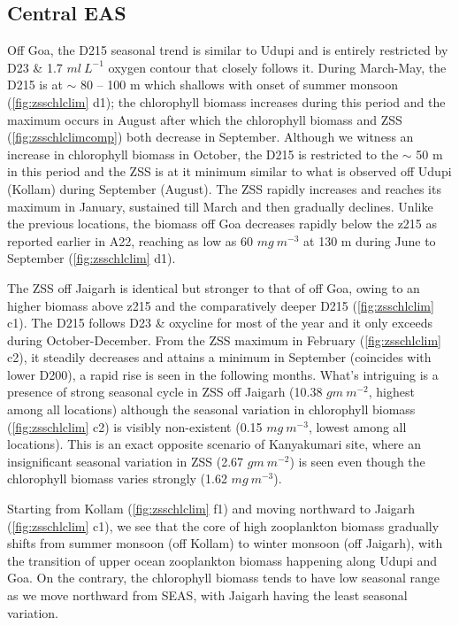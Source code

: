 \documentclass{article}
\begin{document}
	\subsection{Central EAS}
	Off Goa, the D215 seasonal trend is similar to Udupi and is entirely restricted by D23 \& 1.7 $ml \ L^{-1}$ oxygen contour that closely follows it. During March-May, the D215 is at $\sim$ 80 -- 100 m which shallows with onset of summer monsoon (\cref{fig:zsschlclim} d1); the chlorophyll biomass increases during this period and the maximum occurs in August after which the chlorophyll biomass and ZSS (\cref{fig:zsschlclimcomp}) both decrease in September. Although we witness an increase in chlorophyll biomass in October, the D215 is restricted to the $\sim$ 50 m in this period  and the ZSS is at it minimum  similar to what is observed off Udupi (Kollam) during September (August). The ZSS rapidly increases and reaches its maximum in January, sustained till March and then gradually declines. Unlike the previous locations, the biomass off Goa decreases rapidly below the z215 as reported earlier in A22, reaching as low as 60 $mg \ m^{-3}$ at 130 m during June to September (\cref{fig:zsschlclim} d1).
	 
	
	The ZSS off Jaigarh is identical but stronger to that of off Goa, owing to an higher biomass above z215 and the comparatively deeper D215 (\cref{fig:zsschlclim} c1). The D215 follows D23 \& oxycline for most of the year and it only exceeds during October-December.  From the ZSS maximum in February (\cref{fig:zsschlclim} c2), it steadily decreases and attains a minimum in September (coincides with lower D200), a rapid rise is seen in the following months. What's intriguing is a presence of strong seasonal cycle in ZSS off Jaigarh (10.38 $gm\ m^{-2}$, highest among all locations) although the seasonal variation in chlorophyll biomass (\cref{fig:zsschlclim} c2) is visibly non-existent (0.15 $mg\ m^{-3}$, lowest among all locations). This is an exact opposite scenario of Kanyakumari site, where an insignificant seasonal variation in ZSS (2.67 $gm\ m^{-2}$) is seen even though the chlorophyll biomass varies strongly (1.62 $mg\ m^{-3}$). 
		
	Starting from Kollam (\cref{fig:zsschlclim} f1) and moving northward to Jaigarh (\cref{fig:zsschlclim} c1), we see that the core of high zooplankton biomass gradually shifts from summer monsoon (off Kollam) to winter monsoon (off Jaigarh), with the transition of upper ocean zooplankton biomass happening along Udupi and Goa. On the contrary, the chlorophyll biomass tends to have low seasonal range as we move northward from SEAS, with Jaigarh having the least seasonal variation.
	 
\end{document}
